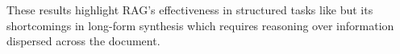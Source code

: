 These results highlight RAG's effectiveness in structured tasks like \finance but its shortcomings in long-form synthesis which requires reasoning over information dispersed across the document. 
%











